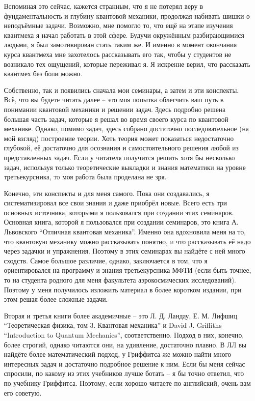 Вспоминая это сейчас, кажется странным, что я не потерял веру в фундаментальность и глубину квантовой механики, продолжая набивать шишки о неподъёмные задачи. Возможно, мне помогло то, что ещё на этапе изучения квантмеха я начал работать в этой сфере. Будучи окружённым разбирающимися людьми, я был замотивирован стать таким же. И именно в момент окончания курса квантмеха мне захотелось рассказывать его так, чтобы у студентов не возникало тех ощущений, которые переживал я. Я искренне верил, что рассказать квантмех без боли можно.

Собственно, так и появились сначала мои семинары, а затем и эти конспекты. Всё, что вы будете читать далее – это моя попытка облегчить ваш путь в понимании квантовой механики и решении задач. Здесь подробно решена большая часть задач, которые я решал во время своего курса по квантовой механике. Однако, помимо задач, здесь собрано достаточно последовательное (на мой взгляд) построение теории. Хоть теория может показаться недостаточно глубокой, её достаточно для осознания и самостоятельного решения любой из представленных задач. Если у читателя получится решить хотя бы несколько задач, используя только теоретические выкладки и знания математики на уровне третьекурсника, то моя работа была проделана не зря.

Конечно, эти конспекты и для меня самого. Пока они создавались, я систематизировал все свои знания и даже приобрёл новые. Всего есть три основных источника, которыми я пользовался при создании этих семинаров. Основная книга, которой я пользовался при создании семинаров, это книга А. Львовского ``Отличная квантовая механика''. Именно она вдохновила меня на то, что квантовую механику можно рассказывать понятно, и что рассказывать её надо через задачки и упражнения. Поэтому в этих семинарах вы найдёте с ней много сходств. Самое большое различие, однако, заключается в том, что я ориентировался на программу и знания третьекурсника МФТИ (если быть точнее, то на студента родного для меня факультета аэрокосмических исследований). Поэтому у меня получилось изложить материал в более коротком издании, при этом решая более сложные задачи.

Вторая и третья книги более академичные -- это Л. Д. Ландау, Е. М. Лифшиц ``Теоретическая физика, том 3. Квантовая механика'' и David J. Griffiths ``Introduction to Quantum Mechanics'', соответственно. Подход в них, конечно, более строгий, однако читаются они, на удивление, достаточно плавно. В ЛЛ вы найдёте более математический подход, у Гриффитса же можно найти много интересных задач и достаточно подробное решение к ним. Если бы меня сейчас спросили, по какому из этих учебников лучше ботать -- я бы точно ответил, что по учебнику Гриффитса. Поэтому, если хорошо читаете по английский, очень вам его советую.

